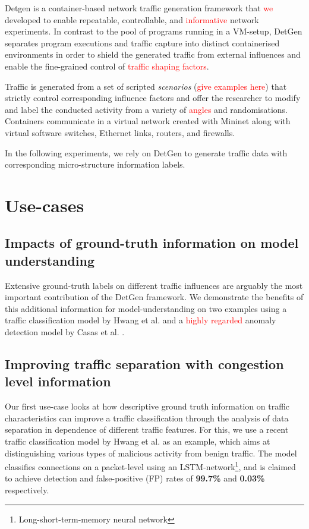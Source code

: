 \documentclass[sigconf]{acmart}
\begin{document}
Detgen is a container-based network traffic generation framework that \textcolor{red}{we} developed to enable repeatable, controllable, and \textcolor{red}{informative} network experiments. In contrast to the pool of programs running in a VM-setup, DetGen separates program executions and traffic capture into distinct containerised environments in order to shield the generated traffic from external influences and enable the fine-grained control of \textcolor{red}{traffic shaping factors}.

Traffic is generated from a set of scripted \textit{scenarios} (\textcolor{red}{give examples here}) that strictly control corresponding influence factors and offer the researcher to modify and label the conducted activity from a variety of \textcolor{red}{angles} and randomisations. Containers communicate in a virtual network created with Mininet along with virtual software switches, Ethernet links, routers, and firewalls.

In the following experiments, we rely on DetGen to generate traffic data with corresponding micro-structure information labels.

\section{Use-cases}

\subsection{Impacts of ground-truth information on model understanding}

Extensive ground-truth labels on different traffic influences are arguably the most important contribution of the DetGen framework. We demonstrate the benefits of this additional information for model-understanding on two examples using a traffic classification model by Hwang et al. \cite{hwang2019lstm} and a \textcolor{red}{highly regarded} anomaly detection model by Casas et al. \cite{casas2012unsupervised}.

\subsection{Improving traffic separation with congestion level information}
Our first use-case looks at how descriptive ground truth information on traffic characteristics can improve a traffic classification through the analysis of data separation in dependence of different traffic features. For this, we use a recent traffic classification model by Hwang et al. \cite{hwang2019lstm} as an example, which aims at distinguishing various types of malicious activity from benign traffic.
The model classifies connections on a packet-level using an LSTM-network\footnote{Long-short-term-memory neural network}, and is claimed to achieve detection and false-positive (FP) rates of \textbf{99.7\%} and \textbf{0.03\%} respectively. 
\end{document}
